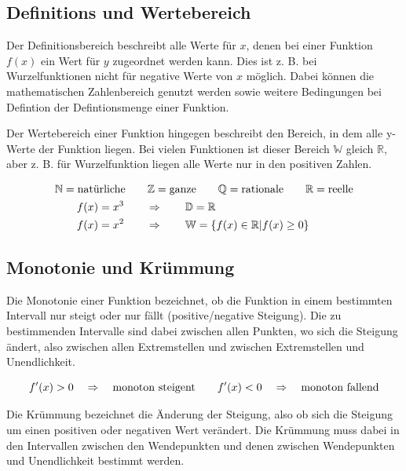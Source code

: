 \subsection{Definitions und Wertebereich}

Der Definitionsbereich beschreibt alle Werte für $x$, denen bei einer Funktion $f(x)$
ein Wert für $y$ zugeordnet werden kann. Dies ist z. B. bei Wurzelfunktionen nicht
für negative Werte von $x$ möglich. Dabei können die mathematischen Zahlenbereich
genutzt werden sowie weitere Bedingungen bei Defintion der Defintionsmenge einer Funktion.
\newline

Der Wertebereich einer Funktion hingegen beschreibt den Bereich, in dem alle y-Werte
der Funktion liegen. Bei vielen Funktionen ist dieser Bereich $\mathbb{W}$ gleich $\mathbb{R}$,
aber z. B. für Wurzelfunktion liegen alle Werte nur in den positiven Zahlen. 

\begin{align*}
    & \mathbb{N} = \textnormal{natürliche} \qquad \mathbb{Z} = \textnormal{ganze} \qquad \mathbb{Q} = \textnormal{rationale} \qquad \mathbb{R} = \textnormal{reelle} \\
    & \qquad f(x) = x^3 \qquad \Rightarrow \qquad \mathbb{D} = \mathbb{R} \\
    & \qquad f(x) = x^2 \qquad \Rightarrow \qquad \mathbb{W} = \{ f(x) \in \mathbb{R} | f(x) \geq 0 \}
\end{align*}

\subsection{Monotonie und Krümmung}

Die Monotonie einer Funktion bezeichnet, ob die Funktion in einem bestimmten
Intervall nur steigt oder nur fällt (positive/negative Steigung).
Die zu bestimmenden Intervalle sind dabei zwischen allen Punkten, wo
sich die Steigung ändert, also zwischen allen Extremstellen und zwischen Extremstellen
und Unendlichkeit.

\begin{equation*}
    f'(x) > 0 \quad \Rightarrow \quad \textnormal{monoton steigent} \qquad f'(x) < 0 \quad \Rightarrow \quad \textnormal{monoton fallend}
\end{equation*}

Die Krümmung bezeichnet die Änderung der Steigung, also ob sich die Steigung um einen
positiven oder negativen Wert verändert. Die Krümmung muss dabei in den Intervallen zwischen
den Wendepunkten und denen zwischen Wendepunkten und Unendlichkeit bestimmt werden.

